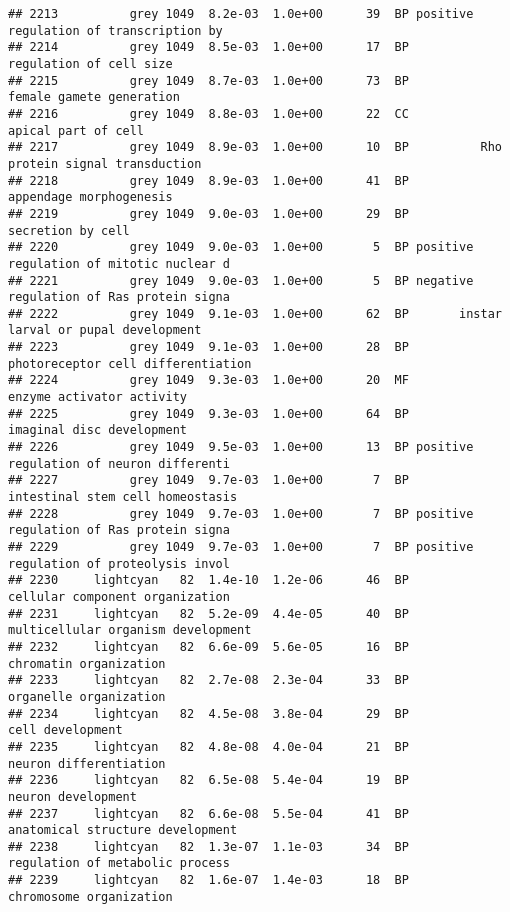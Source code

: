 \documentclass[]{article}
\begin{document}
\begin{verbatim}
## 2213          grey 1049  8.2e-03  1.0e+00      39  BP positive regulation of transcription by 
## 2214          grey 1049  8.5e-03  1.0e+00      17  BP                  regulation of cell size
## 2215          grey 1049  8.7e-03  1.0e+00      73  BP                 female gamete generation
## 2216          grey 1049  8.8e-03  1.0e+00      22  CC                      apical part of cell
## 2217          grey 1049  8.9e-03  1.0e+00      10  BP          Rho protein signal transduction
## 2218          grey 1049  8.9e-03  1.0e+00      41  BP                  appendage morphogenesis
## 2219          grey 1049  9.0e-03  1.0e+00      29  BP                        secretion by cell
## 2220          grey 1049  9.0e-03  1.0e+00       5  BP positive regulation of mitotic nuclear d
## 2221          grey 1049  9.0e-03  1.0e+00       5  BP negative regulation of Ras protein signa
## 2222          grey 1049  9.1e-03  1.0e+00      62  BP       instar larval or pupal development
## 2223          grey 1049  9.1e-03  1.0e+00      28  BP       photoreceptor cell differentiation
## 2224          grey 1049  9.3e-03  1.0e+00      20  MF                enzyme activator activity
## 2225          grey 1049  9.3e-03  1.0e+00      64  BP                imaginal disc development
## 2226          grey 1049  9.5e-03  1.0e+00      13  BP positive regulation of neuron differenti
## 2227          grey 1049  9.7e-03  1.0e+00       7  BP         intestinal stem cell homeostasis
## 2228          grey 1049  9.7e-03  1.0e+00       7  BP positive regulation of Ras protein signa
## 2229          grey 1049  9.7e-03  1.0e+00       7  BP positive regulation of proteolysis invol
## 2230     lightcyan   82  1.4e-10  1.2e-06      46  BP          cellular component organization
## 2231     lightcyan   82  5.2e-09  4.4e-05      40  BP       multicellular organism development
## 2232     lightcyan   82  6.6e-09  5.6e-05      16  BP                   chromatin organization
## 2233     lightcyan   82  2.7e-08  2.3e-04      33  BP                   organelle organization
## 2234     lightcyan   82  4.5e-08  3.8e-04      29  BP                         cell development
## 2235     lightcyan   82  4.8e-08  4.0e-04      21  BP                   neuron differentiation
## 2236     lightcyan   82  6.5e-08  5.4e-04      19  BP                       neuron development
## 2237     lightcyan   82  6.6e-08  5.5e-04      41  BP         anatomical structure development
## 2238     lightcyan   82  1.3e-07  1.1e-03      34  BP          regulation of metabolic process
## 2239     lightcyan   82  1.6e-07  1.4e-03      18  BP                  chromosome organization

\end{verbatim}
\end{document}
